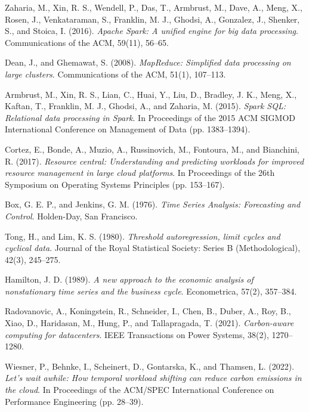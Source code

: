 \documentclass[12pt]{report}
\begin{document}
\begin{enumerate}

Zaharia, M., Xin, R. S., Wendell, P., Das, T., Armbrust, M., Dave, A., Meng, X., Rosen, J., Venkataraman, S., Franklin, M. J., Ghodsi, A., Gonzalez, J., Shenker, S., and Stoica, I. (2016). \emph{Apache Spark: A unified engine for big data processing}. Communications of the ACM, 59(11), 56--65.

Dean, J., and Ghemawat, S. (2008). \emph{MapReduce: Simplified data processing on large clusters}. Communications of the ACM, 51(1), 107--113.

Armbrust, M., Xin, R. S., Lian, C., Huai, Y., Liu, D., Bradley, J. K., Meng, X., Kaftan, T., Franklin, M. J., Ghodsi, A., and Zaharia, M. (2015). \emph{Spark SQL: Relational data processing in Spark}. In Proceedings of the 2015 ACM SIGMOD International Conference on Management of Data (pp. 1383--1394).

Cortez, E., Bonde, A., Muzio, A., Russinovich, M., Fontoura, M., and Bianchini, R. (2017). \emph{Resource central: Understanding and predicting workloads for improved resource management in large cloud platforms}. In Proceedings of the 26th Symposium on Operating Systems Principles (pp. 153--167).

Box, G. E. P., and Jenkins, G. M. (1976). \emph{Time Series Analysis: Forecasting and Control}. Holden-Day, San Francisco.

Tong, H., and Lim, K. S. (1980). \emph{Threshold autoregression, limit cycles and cyclical data}. Journal of the Royal Statistical Society: Series B (Methodological), 42(3), 245--275.

Hamilton, J. D. (1989). \emph{A new approach to the economic analysis of nonstationary time series and the business cycle}. Econometrica, 57(2), 357--384.

Radovanovic, A., Koningstein, R., Schneider, I., Chen, B., Duber, A., Roy, B., Xiao, D., Haridasan, M., Hung, P., and Tallapragada, T. (2021). \emph{Carbon-aware computing for datacenters}. IEEE Transactions on Power Systems, 38(2), 1270--1280.

Wiesner, P., Behnke, I., Scheinert, D., Gontarska, K., and Thamsen, L. (2022). \emph{Let's wait awhile: How temporal workload shifting can reduce carbon emissions in the cloud}. In Proceedings of the ACM/SPEC International Conference on Performance Engineering (pp. 28--39).


\end{enumerate}
\end{document}
